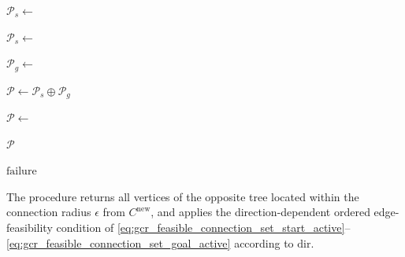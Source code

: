 \documentclass{pas}
\begin{document}
\begin{algorithm}[t]
\begin{algorithmic}[1]
    \State $\mathcal{P}_s\gets$

    \State $\mathcal{P}_s\gets$

    \State $\mathcal{P}_g\gets$

    \State $\mathcal{P}\gets\mathcal{P}_s\oplus\mathcal{P}_g$

    \State $\mathcal{P}\gets$

    \State \Return $\mathcal{P}$

\EndFor

\State \Return $\mathrm{failure}$

\end{algorithmic}
\end{algorithm}

The procedure  returns all vertices of the opposite tree located
within the connection radius \(\epsilon\) from \(C^{\mathrm{new}}\), and
 applies the direction-dependent ordered
edge-feasibility condition of
\eqref{eq:gcr_feasible_connection_set_start_active}--\eqref{eq:gcr_feasible_connection_set_goal_active}
according to \(\mathrm{dir}\).
\end{document}
